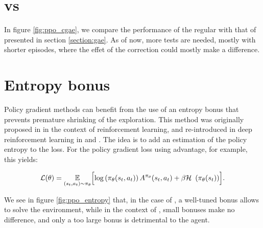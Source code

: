 \section{\gae vs \cgae}

In figure \ref{fig:ppo_cgae}, we compare the performance of the regular \gae with that of \cgae presented in section \ref{section:gae}. As of now, more tests are needed, mostly with shorter episodes, where the effet of the \cgae correction could mostly make a difference.



\section{Entropy bonus}

Policy gradient methods can benefit from the use of an entropy bonus that prevents premature shrinking of the exploration. This method was originally proposed in \cite{williams1991} in the context of reinforcement learning, and re-introduced in deep reinforcement learning in \cite{a2c} and \cite{ppo}. The idea is to add an estimation of the policy entropy to the loss. For the policy gradient loss using advantage, for example, this yields:

\begin{equation}
	\mathcal{L}(\theta) = \expect{(s_t, a_t) \sim \pi_\theta} \Bigl[ \log \left( \pi_\theta (s_t, a_t) \right) A^{\pi_\theta} (s_t, a_t) + \beta \entropy \left( \pi_\theta (s_t) \right) \Bigr].
\end{equation}

We see in figure \ref{fig:ppo_entropy} that, in the case of , a well-tuned bonus allows to solve the environment, while in the context of , small bonuses make no difference, and only a too large bonus is detrimental to the agent.




